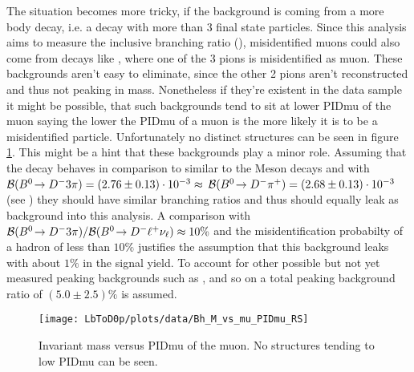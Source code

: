The situation becomes more tricky, if the background is coming from a more body \Lb decay, i.e. a decay with more than 3 final state particles.
Since this analysis aims to measure the inclusive branching ratio \BR(\LbToDpmunuX), misidentified muons could also come from decays like \decay{\Lb}{\Dz\proton 3\pi}, where one of the 3 pions is misidentified as muon.
These backgrounds aren't easy to eliminate, since the other 2 pions aren't reconstructed and thus not peaking in \Dz\proton\mun mass.
Nonetheless if they're existent in the data sample it might be possible, that such backgrounds tend to sit at lower PIDmu of the muon saying the lower the PIDmu of a muon is the more likely it is to be a misidentified particle.
Unfortunately no distinct structures can be seen in figure \ref{fig:plot_D0pmuMass_vs_muPIDmu}.
This might be a hint that these backgrounds play a minor role.
Assuming that the decay \decay{\Lb}{\Dz\proton 3\pi} behaves in comparison to \decay{\Lb}{\Dz\proton\pim} similar to the Meson decays \decay{\Bd}{\Dm 3\pi} and \decay{\Bd}{\Dm\pip} with 
${\cal B}({{B}^0}\!\rightarrow {\ensuremath{{D}^-}} 3\pi) = (2.76 \pm 0.13) \cdot 10^{-3} \approx$ 
${\cal B}({{B}^0}\!\rightarrow {\ensuremath{{D}^-}}{\ensuremath{{\pi}^+}}) = (2.68 \pm 0.13) \cdot 10^{-3}$ (see \cite{PDG})
they should have similar branching ratios and thus should equally leak as background into this analysis.
A comparison with ${\cal B}({{B}^0}\!\rightarrow {\ensuremath{{D}^-}} 3\pi)/{\cal B}({{B}^0}\!\rightarrow {\ensuremath{{D}^-}}{\ensuremath{\ell^+}}{\ensuremath{{\nu}_\ell}}) \approx 10\%$ and the misidentification probabilty of a hadron of less than $10\%$ \cite{muonID_Performance} justifies the assumption that this background leaks with about $1\%$ in the signal yield.
To account for other possible but not yet measured peaking backgrounds such as \decay{\Lb}{\Dz\proton\rhom}, \decay{\Lb}{\Dz\proton\pim\rhoz} and so on a total peaking background ratio of $(5.0 \pm 2.5)\%$ is assumed.
\begin{figure}[hptb]
	\centering
	\texttt{[image: LbToD0p/plots/data/Bh\_M\_vs\_mu\_PIDmu\_RS]}
	\caption{Invariant \Dz\proton\mun mass versus PIDmu of the muon. No structures tending to low PIDmu can be seen.}
	\label{fig:plot_D0pmuMass_vs_muPIDmu}
\end{figure}

